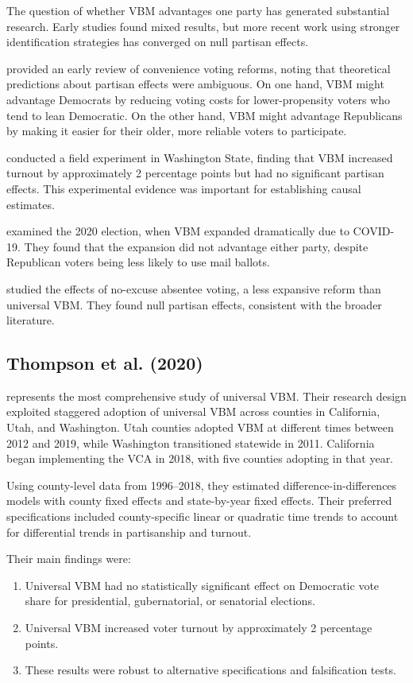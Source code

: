 \documentclass[12pt]{article}
\begin{document}
The question of whether VBM advantages one party has generated substantial research. Early studies found mixed results, but more recent work using stronger identification strategies has converged on null partisan effects.

\citet{gronke2008convenience} provided an early review of convenience voting reforms, noting that theoretical predictions about partisan effects were ambiguous. On one hand, VBM might advantage Democrats by reducing voting costs for lower-propensity voters who tend to lean Democratic. On the other hand, VBM might advantage Republicans by making it easier for their older, more reliable voters to participate.

\citet{gerber2013field} conducted a field experiment in Washington State, finding that VBM increased turnout by approximately 2 percentage points but had no significant partisan effects. This experimental evidence was important for establishing causal estimates.

\citet{barber2022voting} examined the 2020 election, when VBM expanded dramatically due to COVID-19. They found that the expansion did not advantage either party, despite Republican voters being less likely to use mail ballots.

\citet{yoder2021does} studied the effects of no-excuse absentee voting, a less expansive reform than universal VBM. They found null partisan effects, consistent with the broader literature.

\subsection{Thompson et al. (2020)}

\citet{thompson2020universal} represents the most comprehensive study of universal VBM. Their research design exploited staggered adoption of universal VBM across counties in California, Utah, and Washington. Utah counties adopted VBM at different times between 2012 and 2019, while Washington transitioned statewide in 2011. California began implementing the VCA in 2018, with five counties adopting in that year.

Using county-level data from 1996--2018, they estimated difference-in-differences models with county fixed effects and state-by-year fixed effects. Their preferred specifications included county-specific linear or quadratic time trends to account for differential trends in partisanship and turnout.

Their main findings were:
\begin{enumerate}
    \item Universal VBM had no statistically significant effect on Democratic vote share for presidential, gubernatorial, or senatorial elections.
    \item Universal VBM increased voter turnout by approximately 2 percentage points.
    \item These results were robust to alternative specifications and falsification tests.
\end{enumerate}
\end{document}
